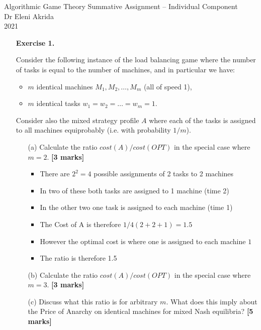 \documentclass{article}
\begin{document}
\begin{center}
	\LARGE{Algorithmic Game Theory Summative Assignment -- Individual Component}\\[0.1cm]
	\Large{Dr Eleni Akrida}\\[0.1cm]
	2021\\[0.5cm]
\end{center}





\begin{enumerate}

	\item[\textbf{Exercise 1.}]   %

	      Consider the following instance of the load balancing game where the number of tasks is equal to the number of machines, and in particular we have:
	      \begin{itemize}
		      \item $m$ identical machines $M_1, M_2, \dots, M_m$ (all of speed 1),
		      \item $m$ identical tasks $w_1 = w_2 = \dots = w_m = 1$.
	      \end{itemize}
	      Consider also the mixed strategy profile $A$ where each of the tasks is assigned to all machines equiprobably (i.e. with probability $1/m$).
	      \begin{enumerate}
		      \item[(a)] Calculate the ratio $cost(A)/cost(OPT)$ in the special case where $m=2$.  \hfill{\bf [3 marks]}\smallskip
		            \begin{itemize}
			            \item There are $2^2=4$ possible assignments of 2 tasks to 2 machines
			            \item In two of these both tasks are assigned to 1 machine (time 2)
			            \item In the other two one task is assigned to each machine (time 1)
			            \item The Cost of A is therefore $1/4(2+2+1)=1.5$
			            \item However the optimal cost is where one is assigned to each machine $1$
			            \item The ratio is therefore 1.5
		            \end{itemize}
		      \item[(b)] Calculate the ratio $cost(A)/cost(OPT)$ in the special case where $m=3$.  \hfill{\bf [3 marks]}\smallskip
		      \item[(c)] Discuss what this ratio is for arbitrary $m$. What does this imply about the Price of Anarchy on identical machines for mixed Nash equilibria?  \hfill{\bf [5 marks]}\smallskip
	      \end{enumerate}
	      \vspace*{0.8cm}



\end{enumerate}
\end{document}
